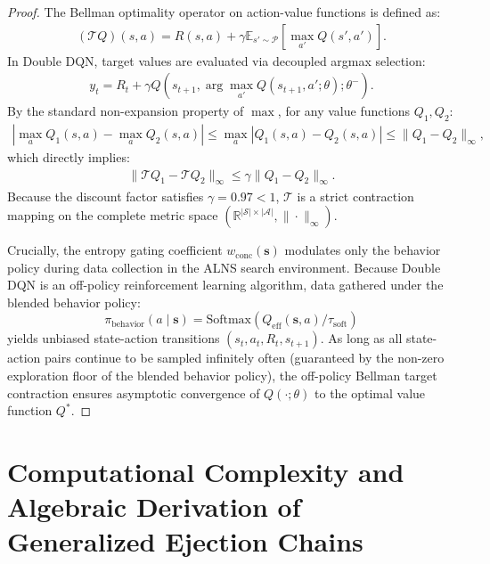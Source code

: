 \documentclass{article}
\begin{document}
\begin{proof}
The Bellman optimality operator on action-value functions is defined as:
\begin{align}
(\mathcal{T} Q)(s, a) = R(s, a) + \gamma \mathbb{E}_{s' \sim \mathcal{P}} \left[ \max_{a'} Q(s', a') \right].
\end{align}
In Double DQN, target values are evaluated via decoupled argmax selection:
\begin{align}
y_t = R_t + \gamma Q(s_{t+1}, \arg\max_{a'} Q(s_{t+1}, a'; \theta); \theta^-).
\end{align}
By the standard non-expansion property of $\max$, for any value functions $Q_1, Q_2$:
\begin{align}
\left| \max_{a} Q_1(s, a) - \max_{a} Q_2(s, a) \right| \le \max_a |Q_1(s, a) - Q_2(s, a)| \le \|Q_1 - Q_2\|_\infty,
\end{align}
which directly implies:
\begin{align}
\|\mathcal{T} Q_1 - \mathcal{T} Q_2\|_\infty \le \gamma \|Q_1 - Q_2\|_\infty.
\end{align}
Because the discount factor satisfies $\gamma = 0.97 < 1$, $\mathcal{T}$ is a strict contraction mapping on the complete metric space $(\mathbb{R}^{|\mathcal{S}| \times |\mathcal{A}|}, \|\cdot\|_\infty)$.

Crucially, the entropy gating coefficient $w_{\text{conc}}(\mathbf{s})$ modulates only the behavior policy during data collection in the ALNS search environment. Because Double DQN is an off-policy reinforcement learning algorithm, data gathered under the blended behavior policy:
\begin{equation}
\pi_{\text{behavior}}(a \mid \mathbf{s}) = \text{Softmax}\left( Q_{\text{eff}}(\mathbf{s}, a) / \tau_{\text{soft}} \right)
\end{equation}
yields unbiased state-action transitions $(s_t, a_t, R_t, s_{t+1})$. As long as all state-action pairs continue to be sampled infinitely often (guaranteed by the non-zero exploration floor of the blended behavior policy), the off-policy Bellman target contraction ensures asymptotic convergence of $Q(\cdot; \theta)$ to the optimal value function $Q^*$.
\end{proof}

\section{Computational Complexity and Algebraic Derivation of Generalized Ejection Chains}
\end{document}
